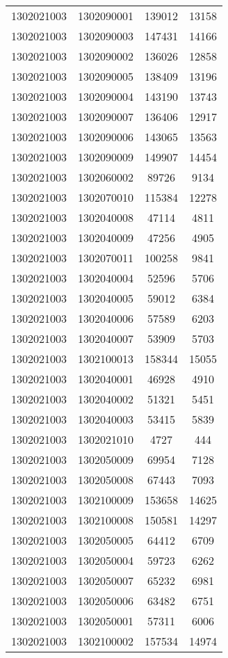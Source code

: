 \begin{longtable}[h]{llcc}
		1302021003 & 1302090001 & 139012 & 13158\\
		1302021003 & 1302090003 & 147431 & 14166\\
		1302021003 & 1302090002 & 136026 & 12858\\
		1302021003 & 1302090005 & 138409 & 13196\\
		1302021003 & 1302090004 & 143190 & 13743\\
		1302021003 & 1302090007 & 136406 & 12917\\
		1302021003 & 1302090006 & 143065 & 13563\\
		1302021003 & 1302090009 & 149907 & 14454\\
		1302021003 & 1302060002 & 89726 & 9134\\
		1302021003 & 1302070010 & 115384 & 12278\\
		1302021003 & 1302040008 & 47114 & 4811\\
		1302021003 & 1302040009 & 47256 & 4905\\
		1302021003 & 1302070011 & 100258 & 9841\\
		1302021003 & 1302040004 & 52596 & 5706\\
		1302021003 & 1302040005 & 59012 & 6384\\
		1302021003 & 1302040006 & 57589 & 6203\\
		1302021003 & 1302040007 & 53909 & 5703\\
		1302021003 & 1302100013 & 158344 & 15055\\
		1302021003 & 1302040001 & 46928 & 4910\\
		1302021003 & 1302040002 & 51321 & 5451\\
		1302021003 & 1302040003 & 53415 & 5839\\
		1302021003 & 1302021010 & 4727 & 444\\
		1302021003 & 1302050009 & 69954 & 7128\\
		1302021003 & 1302050008 & 67443 & 7093\\
		1302021003 & 1302100009 & 153658 & 14625\\
		1302021003 & 1302100008 & 150581 & 14297\\
		1302021003 & 1302050005 & 64412 & 6709\\
		1302021003 & 1302050004 & 59723 & 6262\\
		1302021003 & 1302050007 & 65232 & 6981\\
		1302021003 & 1302050006 & 63482 & 6751\\
		1302021003 & 1302050001 & 57311 & 6006\\
		1302021003 & 1302100002 & 157534 & 14974\\

\end{longtable}

